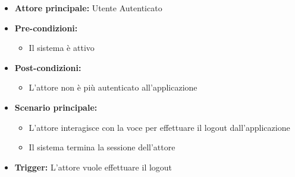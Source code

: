 \documentclass[a4paper,12pt]{article}
\begin{document}
\begin{itemize}
    \item \textbf{Attore principale:} Utente Autenticato
    \item \textbf{Pre-condizioni:} 
    \begin{itemize}
        \item Il sistema è attivo
    \end{itemize}
    \item \textbf{Post-condizioni:}
    \begin{itemize}
        \item L’attore non è più autenticato all'applicazione
    \end{itemize}
    \item \textbf{Scenario principale:}
    \begin{itemize}
        \item L'attore interagisce con la voce per effettuare il logout dall'applicazione
        \item Il sistema termina la sessione dell'attore
    \end{itemize}
    \item \textbf{Trigger:} L'attore vuole effettuare il logout
\end{itemize}

\end{document}
